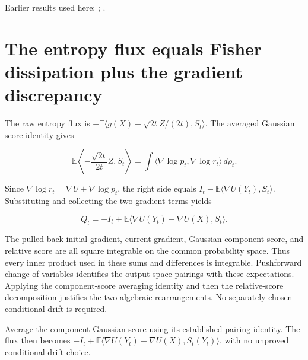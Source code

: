 \documentclass[11pt,a4paper]{article}
\begin{document}
Earlier results used here: \cite[Section~3.26.3]{LangevinLean2026ULASC}; \cite[Section~3.36.5]{LangevinLean2026ULASC}.

\section{\texorpdfstring{The entropy flux equals Fisher dissipation plus the gradient discrepancy}{The entropy flux equals Fisher dissipation plus the gradient discrepancy}}


The raw entropy flux is \(-\mathbb E\langle g(X)-\sqrt{2t}Z/(2t),S_t\rangle\). The averaged Gaussian score identity gives

\[\mathbb E\left\langle-\frac{\sqrt{2t}}{2t}Z,S_t\right\rangle=\int\langle\nabla\log p_t,\nabla\log r_t\rangle\,d\rho_t.\]

Since \(\nabla\log r_t=\nabla U+\nabla\log p_t\), the right side equals \(I_t-\mathbb E\langle\nabla U(Y_t),S_t\rangle\). Substituting and collecting the two gradient terms yields

\[Q_t=-I_t+\mathbb E\langle\nabla U(Y_t)-\nabla U(X),S_t\rangle.\]

The pulled-back initial gradient, current gradient, Gaussian component score, and relative score are all square integrable on the common probability space. Thus every inner product used in these sums and differences is integrable. Pushforward change of variables identifies the output-space pairings with these expectations. Applying the component-score averaging identity and then the relative-score decomposition justifies the two algebraic rearrangements. No separately chosen conditional drift is required.



Average the component Gaussian score using its established pairing identity. The flux then becomes \(-I_t+\mathbb E\langle\nabla U(Y_t)-\nabla U(X),S_t(Y_t)\rangle\), with no unproved conditional-drift choice.
\end{document}
